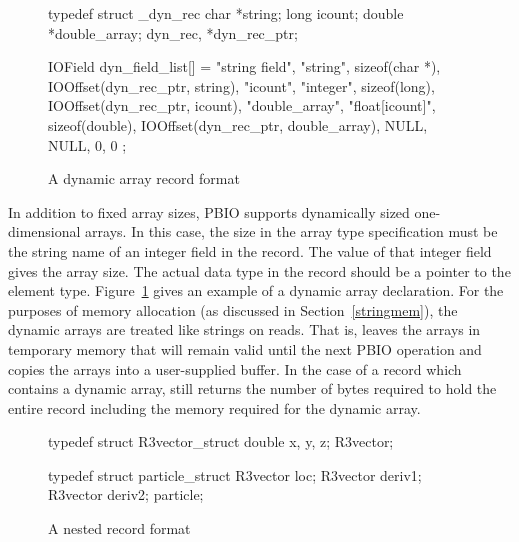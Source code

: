 \begin{figure}
\begin{WrapCode}
typedef struct _dyn_rec {
    char        *string;
    long        icount;
    double      *double_array;
} dyn_rec, *dyn_rec_ptr;

IOField dyn_field_list[] = {
    {"string field", "string", sizeof(char *), 
      IOOffset(dyn_rec_ptr, string)},
    {"icount", "integer", sizeof(long), 
      IOOffset(dyn_rec_ptr, icount)},
    {"double_array", "float[icount]", sizeof(double), 
      IOOffset(dyn_rec_ptr, double_array)},
    { NULL, NULL, 0, 0}
};
\end{WrapCode}
\caption{A dynamic array record format\label{fig:dynarray}}
\end{figure}

In addition to fixed array sizes, PBIO supports dynamically sized
one-dimensional arrays.  In this case, the size in the array type
specification must be the string name of an integer field in the record.
The value of that integer field gives the array size.  The actual data type
in the record should be a pointer to the element type.
Figure~\ref{fig:dynarray} gives an example of a dynamic array declaration.
For the purposes of memory allocation (as discussed in
Section~\ref{stringmem}), the dynamic arrays are treated like strings on
reads.  That is,  leaves the arrays in temporary
memory that will remain valid until the next PBIO operation and
 copies the arrays into a user-supplied
buffer.  In the case of a record which contains a dynamic array,
 still returns the number of bytes
required to hold the entire record including the memory required for the
dynamic array.

\begin{figure}
\vspace*{-0.25in}
\begin{WrapCode}
 typedef struct R3vector_struct { 
     double x, y, z;
 } R3vector;

 typedef struct particle_struct { 
     R3vector   loc;
     R3vector   deriv1;
     R3vector   deriv2;
 } particle;
\end{WrapCode}
\caption{A nested record format\label{fig:part}}
\end{figure}

